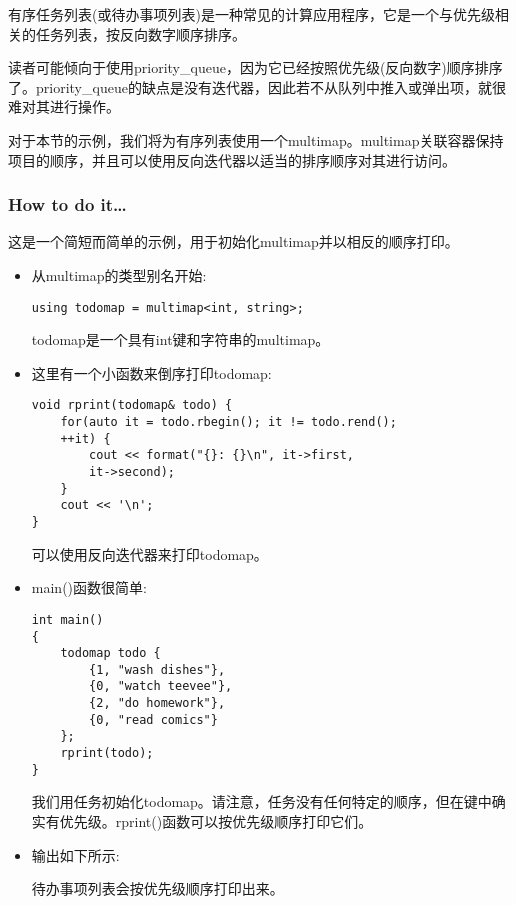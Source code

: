 
有序任务列表(或待办事项列表)是一种常见的计算应用程序，它是一个与优先级相关的任务列表，按反向数字顺序排序。

读者可能倾向于使用priority\_queue，因为它已经按照优先级(反向数字)顺序排序了。priority\_queue的缺点是没有迭代器，因此若不从队列中推入或弹出项，就很难对其进行操作。

对于本节的示例，我们将为有序列表使用一个multimap。multimap关联容器保持项目的顺序，并且可以使用反向迭代器以适当的排序顺序对其进行访问。

\subsubsection{How to do it…}

这是一个简短而简单的示例，用于初始化multimap并以相反的顺序打印。

\begin{itemize}
\item 
从multimap的类型别名开始:

\begin{lstlisting}[style=styleCXX]
using todomap = multimap<int, string>;
\end{lstlisting}

todomap是一个具有int键和字符串的multimap。

\item 
这里有一个小函数来倒序打印todomap:

\begin{lstlisting}[style=styleCXX]
void rprint(todomap& todo) {
	for(auto it = todo.rbegin(); it != todo.rend();
	++it) {
		cout << format("{}: {}\n", it->first,
		it->second);
	}
	cout << '\n';
}
\end{lstlisting}

可以使用反向迭代器来打印todomap。

\item 
main()函数很简单:

\begin{lstlisting}[style=styleCXX]
int main()
{
	todomap todo {
		{1, "wash dishes"},
		{0, "watch teevee"},
		{2, "do homework"},
		{0, "read comics"}
	};
	rprint(todo);
}
\end{lstlisting}

我们用任务初始化todomap。请注意，任务没有任何特定的顺序，但在键中确实有优先级。rprint()函数可以按优先级顺序打印它们。

\item 
输出如下所示:


待办事项列表会按优先级顺序打印出来。

\end{itemize}


